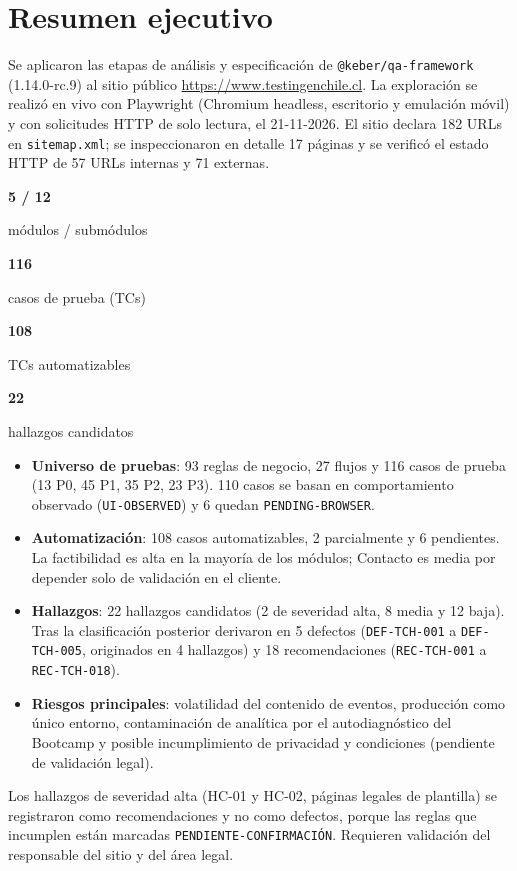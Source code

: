 \documentclass[11pt,a4paper]{article}
\newcommand{\stat}[2]{%
  \begin{tcolorbox}[colback=primary!6, colframe=primary!40, boxrule=0.5pt,
    nobeforeafter, box align=top, width=0.235\linewidth, halign=center, left=2pt, right=2pt, top=4pt, bottom=4pt]
  {\LARGE\bfseries\color{primary}#1}\par\smallskip
  {\footnotesize\color{muted}#2}
  \end{tcolorbox}}
\newcommand{\code}[1]{\texttt{#1}}
\begin{document}
\section{Resumen ejecutivo}

Se aplicaron las etapas de análisis y especificación de \code{@keber/qa-framework}
(1.14.0-rc.9) al sitio público \url{https://www.testingenchile.cl}. La exploración se
realizó en vivo con Playwright (Chromium headless, escritorio y emulación móvil) y con
solicitudes HTTP de solo lectura, el \mbox{21-11-2026}. El sitio declara 182 URLs en
\code{sitemap.xml}; se inspeccionaron en detalle 17 páginas y se verificó el estado HTTP de
57 URLs internas y 71 externas.

\begin{center}
\stat{5 / 12}{módulos / submódulos}\hfill
\stat{116}{casos de prueba (TCs)}\hfill
\stat{108}{TCs automatizables}\hfill
\stat{22}{hallazgos candidatos}
\end{center}

\begin{itemize}
  \item \textbf{Universo de pruebas}: 93 reglas de negocio, 27 flujos y 116 casos de prueba
    (13 P0, 45 P1, 35 P2, 23 P3). 110 casos se basan en comportamiento observado
    (\code{UI-OBSERVED}) y 6 quedan \code{PENDING-BROWSER}.
  \item \textbf{Automatización}: 108 casos automatizables, 2 parcialmente y 6 pendientes.
    La factibilidad es alta en la mayoría de los módulos; Contacto es media por depender
    solo de validación en el cliente.
  \item \textbf{Hallazgos}: 22 hallazgos candidatos (2 de severidad alta, 8 media y 12 baja).
    Tras la clasificación posterior derivaron en 5 defectos (\code{DEF-TCH-001} a
    \code{DEF-TCH-005}, originados en 4 hallazgos) y 18 recomendaciones
    (\code{REC-TCH-001} a \code{REC-TCH-018}).
  \item \textbf{Riesgos principales}: volatilidad del contenido de eventos, producción como
    único entorno, contaminación de analítica por el autodiagnóstico del Bootcamp y posible
    incumplimiento de privacidad y condiciones (pendiente de validación legal).
\end{itemize}

\begin{infobox}
Los hallazgos de severidad alta (\mbox{HC-01} y \mbox{HC-02}, páginas legales de plantilla) se registraron
como recomendaciones y no como defectos, porque las reglas que incumplen están marcadas
\code{PENDIENTE-CONFIRMACIÓN}. Requieren validación del responsable del sitio y del área legal.
\end{infobox}
\end{document}
